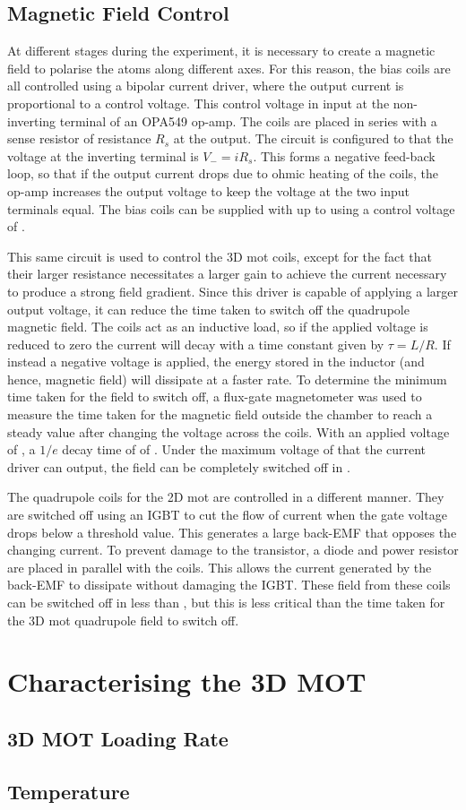 \subsection{Magnetic Field Control}
At different stages during the experiment, it is necessary to create a magnetic
field to polarise the atoms along different axes. For this reason, the bias
coils are all controlled using a bipolar current driver, where the output
current is proportional to a control voltage. This control voltage in input at
the non-inverting terminal of an OPA549 op-amp. The coils are placed in series
with a sense resistor of resistance \(R_s\) at the output. The circuit is
configured to that the voltage at the inverting terminal is \(V_- = i R_s\).
This forms a negative feed-back loop, so that if the output current drops due to
ohmic heating of the coils, the op-amp increases the output voltage to keep the
voltage at the two input terminals equal. The bias coils can be supplied with up
to  using a control voltage of .
\par\noindent 
This same circuit is used to control the 3D \ac{mot} coils, except
for the fact that their larger resistance necessitates a larger gain to achieve
the current necessary to produce a strong field gradient. Since this driver is
capable of applying a larger output voltage, it can reduce the time taken to
switch off the quadrupole magnetic field. The coils act as an inductive load, so
if the applied voltage is reduced to zero the current will decay with a time
constant given by \(\tau = L/R\). If instead a negative voltage is applied, the
energy stored in the inductor (and hence, magnetic field) will dissipate at a
faster rate. To determine the minimum time taken for the field to switch off, a
flux-gate magnetometer was used to measure the time taken for the magnetic field
outside the chamber to reach a steady value after changing the voltage across
the coils. With an applied voltage of , a \(1/e\) decay time
of of . Under the maximum voltage  of
 that the current driver can output, the field can be
completely switched off in . \par\noindent The
quadrupole coils for the 2D \ac{mot} are controlled in a different manner. They
are switched off using an IGBT to cut the flow of current when the gate voltage
drops below a threshold value. This generates a large back-EMF that opposes the
changing current. To prevent damage to the transistor, a diode and
 power resistor are placed in parallel with the coils. This
allows the current generated by the back-EMF to dissipate without damaging the
IGBT. These field from these coils can be switched off in less than
, but this is less critical than the time taken for
the 3D \ac{mot} quadrupole field to switch off.

\section{Characterising the 3D MOT}
\subsection{3D MOT Loading Rate}\label{subsec:loading_rate}
\subsection{Temperature}

